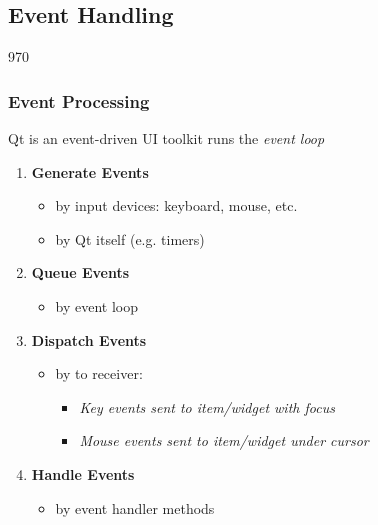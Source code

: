 %
%
%
%

\subsection{Event Handling}

\begin{slide}{970}
\frametitle{Event Processing}
\label{events_introduction}

\begin{block}{Qt is an event-driven UI toolkit}
 runs the \textit{event loop}
\end{block}
\begin{enumerate}
\item \textbf{Generate Events}
  \begin{itemize}
  \item by input devices: keyboard, mouse, etc.
  \item by Qt itself (e.g. timers)
  \end{itemize}
\item \textbf{Queue Events}
  \begin{itemize}
  \item by event loop
  \end{itemize}
\item \textbf{Dispatch Events}
  \begin{itemize}
  \item by  to receiver: 
    \begin{itemize}
    \item \textit{Key events sent to item/widget with focus}
    \item \textit{Mouse events sent to item/widget under cursor}
    \end{itemize}
 \end{itemize}
\item \textbf{Handle Events}
  \begin{itemize}
  \item by  event handler methods
  \end{itemize}
\end{enumerate}
\end{slide}

